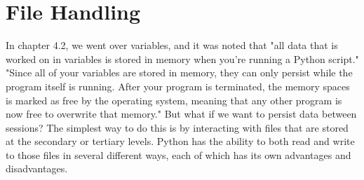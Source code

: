 \chapter{File Handling}
In chapter 4.2, we went over variables, and it was noted that "all data that is worked on in variables is stored in memory when you're running a Python script." "Since all of your variables are stored in memory, they can only persist while the program itself is running. After your program is terminated, the memory spaces is marked as free by the operating system, meaning that any other program is now free to overwrite that memory." But what if we want to persist data between sessions? The simplest way to do this is by interacting with files that are stored at the secondary or tertiary levels. Python has the ability to both read and write to those files in several different ways, each of which has its own advantages and disadvantages.
